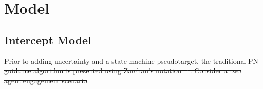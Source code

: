 \documentclass[conference]{IEEEtran}
\providecommand{\DIFdel}[1]{{\protect\color{red}\sout{#1}}}                      %
\providecommand{\DIFaddbegin}{} %
\providecommand{\DIFdelbegin}{} %
\providecommand{\DIFdelend}{} %
\newcommand{\DIFscaledelfig}{0.5}
\newlength{\DIFdelgraphicswidth} %
\newlength{\DIFdelgraphicsheight} %
\newcommand{\DIFaddincludegraphics}[2][]{{\color{blue}\fbox{\DIFOincludegraphics[#1]{#2}}}} %
\newcommand{\DIFdelincludegraphics}[2][]{%
\sbox{\DIFdelgraphicsbox}{\DIFOincludegraphics[#1]{#2}}%
\settoboxwidth{\DIFdelgraphicswidth}{\DIFdelgraphicsbox} %
\settoboxtotalheight{\DIFdelgraphicsheight}{\DIFdelgraphicsbox} %
\scalebox{\DIFscaledelfig}{%
\parbox[b]{\DIFdelgraphicswidth}{\usebox{\DIFdelgraphicsbox}\\[-\baselineskip] \rule{\DIFdelgraphicswidth}{0em}}\llap{\resizebox{\DIFdelgraphicswidth}{\DIFdelgraphicsheight}{%
\setlength{\unitlength}{\DIFdelgraphicswidth}%
\begin{picture}(1,1)%
\thicklines\linethickness{2pt} %
{\color[rgb]{1,0,0}\put(0,0){\framebox(1,1){}}}%
{\color[rgb]{1,0,0}\put(0,0){\line( 1,1){1}}}%
{\color[rgb]{1,0,0}\put(0,1){\line(1,-1){1}}}%
\end{picture}%
}\hspace*{3pt}}} %
} %
\DeclareRobustCommand{\DIFaddbegin}{\DIFOaddbegin \let\includegraphics\DIFaddincludegraphics} %
\DeclareRobustCommand{\DIFdelbegin}{\DIFOdelbegin \let\includegraphics\DIFdelincludegraphics} %
\DeclareRobustCommand{\DIFdelend}{\DIFOaddend \let\includegraphics\DIFOincludegraphics} %
\begin{document}
\section{Model}





\subsection{Intercept Model}
\DIFdelbegin \DIFdel{Prior to adding uncertainty and a state machine pseudotarget, the traditional PN guidance algorithm is presented using Zarchan's notation \mbox{%
\cite{zarchan}}\hspace{0pt}%
. Consider a two agent engagement scenario }\DIFdelend \DIFaddbegin 
\end{document}
